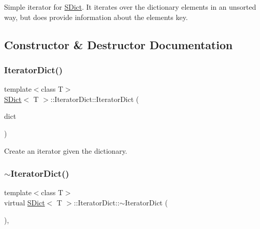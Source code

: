 Simple iterator for \mbox{\hyperlink{class_s_dict}{S\+Dict}}. It iterates over the dictionary elements in an unsorted way, but does provide information about the element\textquotesingle{}s key. 

\subsection{Constructor \& Destructor Documentation}
\mbox{\label{class_s_dict_1_1_iterator_dict_a23920bdd95642c98bf29aaafbb55f949}} 
\subsubsection{\texorpdfstring{IteratorDict()}{IteratorDict()}}
{\footnotesize\ttfamily template$<$class T$>$ \\
\mbox{\hyperlink{class_s_dict}{S\+Dict}}$<$ T $>$\+::Iterator\+Dict\+::\+Iterator\+Dict (\begin{DoxyParamCaption}\item[{const \mbox{\hyperlink{class_s_dict}{S\+Dict}}$<$ T $>$ \&}]{dict }\end{DoxyParamCaption})\hspace{0.3cm}{\ttfamily [inline]}}

Create an iterator given the dictionary. \mbox{\label{class_s_dict_1_1_iterator_dict_a38499552aca040055682862929ab4477}} 
\subsubsection{\texorpdfstring{$\sim$IteratorDict()}{~IteratorDict()}}
{\footnotesize\ttfamily template$<$class T$>$ \\
virtual \mbox{\hyperlink{class_s_dict}{S\+Dict}}$<$ T $>$\+::Iterator\+Dict\+::$\sim$\+Iterator\+Dict (\begin{DoxyParamCaption}{ }\end{DoxyParamCaption})\hspace{0.3cm}{\ttfamily [inline]}, {\ttfamily [virtual]}}

